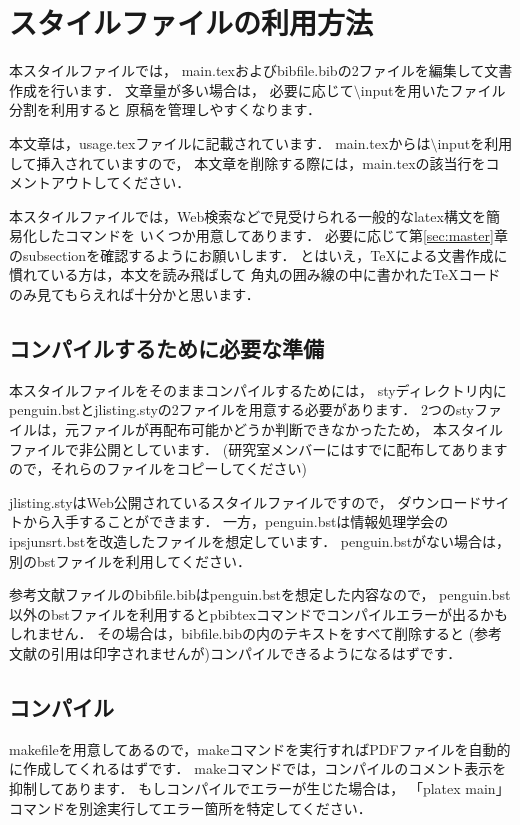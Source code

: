 \section{スタイルファイルの利用方法}
\label{sec:usage}

本スタイルファイルでは，
main.texおよびbibfile.bibの2ファイルを編集して文書作成を行います．
文章量が多い場合は，
必要に応じて$\setminus$inputを用いたファイル分割を利用すると
原稿を管理しやすくなります．

本文章は，usage.texファイルに記載されています．
main.texからは$\setminus$inputを利用して挿入されていますので，
本文章を削除する際には，main.texの該当行をコメントアウトしてください．

本スタイルファイルでは，Web検索などで見受けられる一般的なlatex構文を簡易化したコマンドを
いくつか用意してあります．
必要に応じて第\ref{sec:master}章のsubsectionを確認するようにお願いします．
とはいえ，TeXによる文書作成に慣れている方は，本文を読み飛ばして
角丸の囲み線の中に書かれたTeXコードのみ見てもらえれば十分かと思います．

\subsection{コンパイルするために必要な準備}
本スタイルファイルをそのままコンパイルするためには，
styディレクトリ内にpenguin.bstとjlisting.styの2ファイルを用意する必要があります．
2つのstyファイルは，元ファイルが再配布可能かどうか判断できなかったため，
本スタイルファイルで非公開としています．
(研究室メンバーにはすでに配布してありますので，それらのファイルをコピーしてください)

jlisting.styはWeb公開されているスタイルファイルですので，
ダウンロードサイトから入手することができます．
一方，penguin.bstは情報処理学会のipsjunsrt.bstを改造したファイルを想定しています．
penguin.bstがない場合は，別のbstファイルを利用してください．

参考文献ファイルのbibfile.bibはpenguin.bstを想定した内容なので，
penguin.bst以外のbstファイルを利用するとpbibtexコマンドでコンパイルエラーが出るかもしれません．
その場合は，bibfile.bibの内のテキストをすべて削除すると
(参考文献の引用は印字されませんが)コンパイルできるようになるはずです．

\subsection{コンパイル}
makefileを用意してあるので，makeコマンドを実行すればPDFファイルを自動的に作成してくれるはずです．
makeコマンドでは，コンパイルのコメント表示を抑制してあります．
もしコンパイルでエラーが生じた場合は，
「platex main」コマンドを別途実行してエラー箇所を特定してください．

